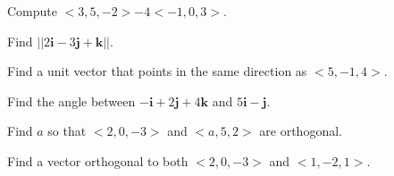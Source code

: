 \documentclass{exam}[12pt]
\begin{document}
\pagestyle{head}

\extraheadheight{.3in}
\extrafootheight{-.3in} 


\vspace{.2in}
\large{

\begin{questions}

\question Compute $<3,5,-2> - 4<-1,0,3>$.
\vspace{.7in}

\question Find $||2\mathbf{i} -3\mathbf{j} +\mathbf{k}||$.
\vspace{1in}

\question Find a unit vector that points in the same direction as $<5,-1,4>$.
\vspace{1in}

\question Find the angle between $-\mathbf{i}+2\mathbf{j}+4\mathbf{k}$ and
 $5\mathbf{i}-\mathbf{j}$.
\vspace{2in}

\question Find $a$ so that $<2,0,-3>$ and $<a,5,2>$ are orthogonal.
\vspace{2in}

\question Find a vector orthogonal to both $<2,0,-3>$ and $<1,-2,1>$.
\end{questions}

}
\end{document}
